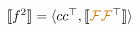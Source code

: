 \documentclass[crop,equation,convert={outext=.svg,command=\unexpanded{pdf2svg \infile\space\outfile}},multi=false]{standalone}
\begin{document}
\color{black}
    $\llbracket f^2 \rrbracket = \langle cc^\top, \llbracket{\color{darkorange}\mathcal{F}}{\color{darkorange}\mathcal{F}}^\top\rrbracket\rangle$
\end{document}
